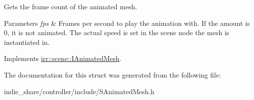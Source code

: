 Gets the frame count of the animated mesh. 


\begin{DoxyParams}{Parameters}
{\em fps} & Frames per second to play the animation with. If the amount is 0, it is not animated. The actual speed is set in the scene node the mesh is instantiated in. \\
\hline
\end{DoxyParams}


Implements \hyperlink{classirr_1_1scene_1_1IAnimatedMesh_a5eb1b09d96547dbd273d489e58d62658}{irr\+::scene\+::\+I\+Animated\+Mesh}.



The documentation for this struct was generated from the following file\+:\begin{DoxyCompactItemize}
\item 
indie\+\_\+share/controller/include/S\+Animated\+Mesh.\+h\end{DoxyCompactItemize}
